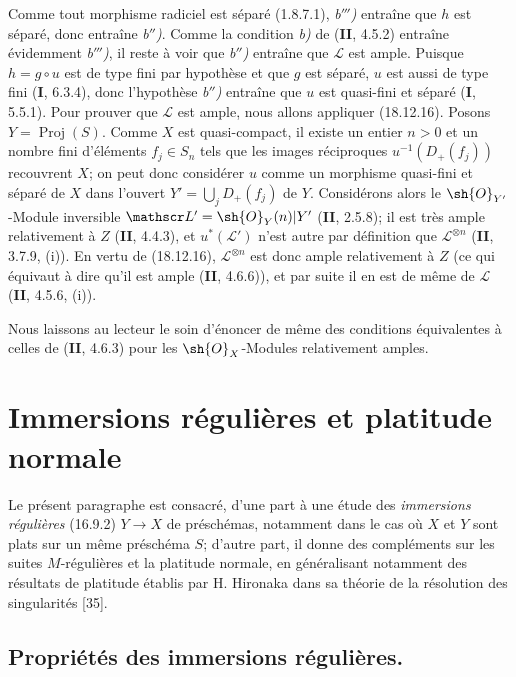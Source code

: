 Comme tout morphisme radiciel est séparé (1.8.7.1), \emph{b$'''$)} entraîne que $h$ est séparé, donc entraîne \emph{b$''$)}. Comme la condition \emph{b)} de (\textbf{II}, 4.5.2) entraîne évidemment \emph{b$'''$)}, il reste à voir que \emph{b$''$)} entraîne que $\mathscr L$ est ample. Puisque $h=g\circ u$ est de type fini par hypothèse et que $g$ est séparé, $u$ est aussi de type fini (\textbf{I}, 6.3.4), donc l'hypothèse \emph{b$''$)} entraîne que $u$ est quasi-fini et séparé (\textbf{I}, 5.5.1). Pour prouver que $\mathscr L$ est ample, nous allons appliquer (18.12.16). Posons $Y=\operatorname{Proj}(S)$. Comme $X$ est quasi-compact, il existe un entier $n>0$ et un nombre fini d'éléments $f_j\in S_n$ tels que les images réciproques $u^{-1}(D_+(f_j))$ recouvrent $X$; on peut donc considérer $u$ comme un morphisme quasi-fini et séparé de $X$ dans l'ouvert $Y'=\bigcup_j D_+(f_j)$ de $Y$. Considérons alors le $\sh{O}_{Y'}$-Module inversible $\mathscr L'=\sh{O}_Y(n)|Y'$ (\textbf{II}, 2.5.8); il est très ample relativement à $Z$ (\textbf{II}, 4.4.3), et $u^*(\mathscr L')$ n'est autre par définition que $\mathscr L^{\otimes n}$
(\textbf{II}, 3.7.9, (i)). En vertu de (18.12.16), $\mathscr L^{\otimes n}$ est donc ample relativement à $Z$ (ce qui équivaut à dire qu'il est ample (\textbf{II}, 4.6.6)), et par suite il en est de même de $\mathscr L$ (\textbf{II}, 4.5.6, (i)).

Nous laissons au lecteur le soin d'énoncer de même des conditions équivalentes à celles de (\textbf{II}, 4.6.3) pour les $\sh{O}_X$-Modules relativement amples.

\section{Immersions régulières et platitude normale}
\label{section:IV.19}

Le présent paragraphe est consacré, d'une part à une étude des \emph{immersions régulières} (16.9.2) $Y\to X$ de préschémas, notamment dans le cas où $X$ et $Y$ sont plats sur un même préschéma $S$; d'autre part, il donne des compléments sur les suites $M$-régulières et la platitude normale, en généralisant notamment des résultats de platitude établis par H. Hironaka dans sa théorie de la résolution des singularités [35].

\subsection{Propriétés des immersions régulières.}


